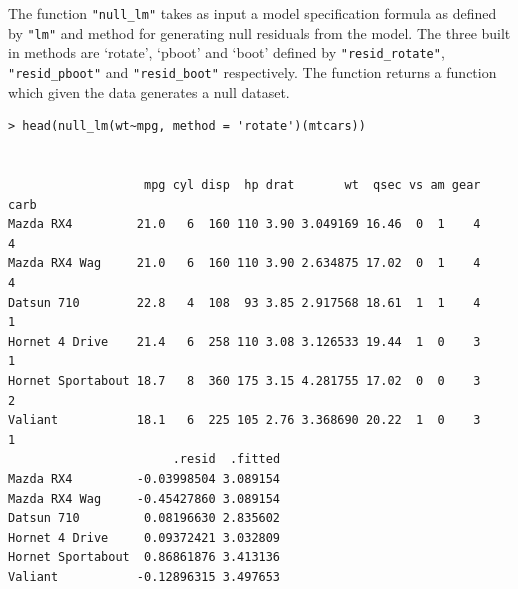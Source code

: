 The function \texttt{"null\_lm"} takes as input a model specification
formula as defined by \texttt{"lm"} and method for generating null
residuals from the model. The three built in methods are `rotate',
`pboot' and `boot' defined by \texttt{"resid\_rotate"},
\texttt{"resid\_pboot"} and \texttt{"resid\_boot"} respectively. The
function returns a function which given the data generates a null
dataset.


%

\begin{verbatim}
> head(null_lm(wt~mpg, method = 'rotate')(mtcars))


                   mpg cyl disp  hp drat       wt  qsec vs am gear carb
Mazda RX4         21.0   6  160 110 3.90 3.049169 16.46  0  1    4    4
Mazda RX4 Wag     21.0   6  160 110 3.90 2.634875 17.02  0  1    4    4
Datsun 710        22.8   4  108  93 3.85 2.917568 18.61  1  1    4    1
Hornet 4 Drive    21.4   6  258 110 3.08 3.126533 19.44  1  0    3    1
Hornet Sportabout 18.7   8  360 175 3.15 4.281755 17.02  0  0    3    2
Valiant           18.1   6  225 105 2.76 3.368690 20.22  1  0    3    1
                       .resid  .fitted
Mazda RX4         -0.03998504 3.089154
Mazda RX4 Wag     -0.45427860 3.089154
Datsun 710         0.08196630 2.835602
Hornet 4 Drive     0.09372421 3.032809
Hornet Sportabout  0.86861876 3.413136
Valiant           -0.12896315 3.497653
\end{verbatim}

